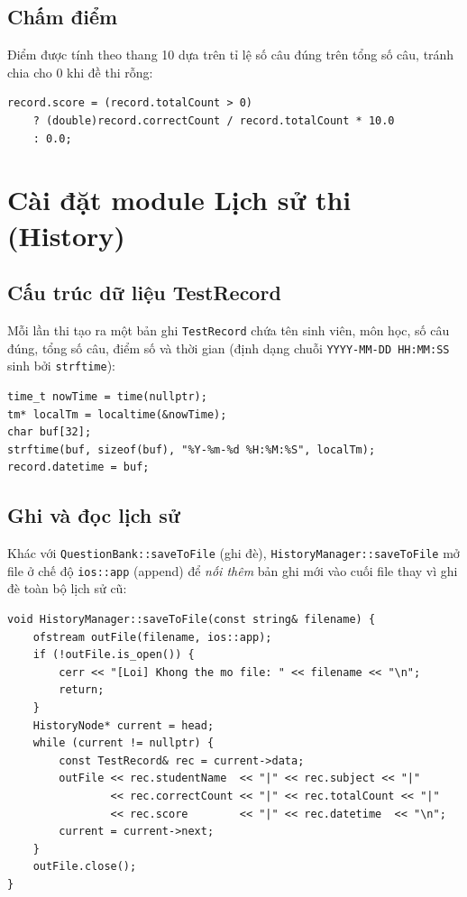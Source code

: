 \documentclass[11pt]{report}
\begin{document}
\subsection{Chấm điểm}

Điểm được tính theo thang 10 dựa trên tỉ lệ số câu đúng trên tổng số câu, tránh chia cho 0 khi đề thi rỗng:

\begin{lstlisting}[caption={Công thức tính điểm (Exam.cpp)}, label={lst:exam_score}]
record.score = (record.totalCount > 0)
    ? (double)record.correctCount / record.totalCount * 10.0
    : 0.0;
\end{lstlisting}

\section{Cài đặt module Lịch sử thi (History)}

\subsection{Cấu trúc dữ liệu TestRecord}

Mỗi lần thi tạo ra một bản ghi \texttt{TestRecord} chứa tên sinh viên, môn học, số câu đúng, tổng số câu, điểm số và thời gian (định dạng chuỗi \texttt{YYYY-MM-DD HH:MM:SS} sinh bởi \texttt{strftime}):

\begin{lstlisting}[caption={Ghi nhận timestamp khi nộp bài (Exam.cpp)}, label={lst:timestamp}]
time_t nowTime = time(nullptr);
tm* localTm = localtime(&nowTime);
char buf[32];
strftime(buf, sizeof(buf), "%Y-%m-%d %H:%M:%S", localTm);
record.datetime = buf;
\end{lstlisting}

\subsection{Ghi và đọc lịch sử}

Khác với \texttt{QuestionBank::saveToFile} (ghi đè), \texttt{HistoryManager::saveToFile} mở file ở chế độ \texttt{ios::app} (append) để \textit{nối thêm} bản ghi mới vào cuối file thay vì ghi đè toàn bộ lịch sử cũ:

\begin{lstlisting}[caption={Ghi lịch sử ở chế độ append (History.cpp)}, label={lst:history_save}]
void HistoryManager::saveToFile(const string& filename) {
    ofstream outFile(filename, ios::app);
    if (!outFile.is_open()) {
        cerr << "[Loi] Khong the mo file: " << filename << "\n";
        return;
    }
    HistoryNode* current = head;
    while (current != nullptr) {
        const TestRecord& rec = current->data;
        outFile << rec.studentName  << "|" << rec.subject << "|"
                << rec.correctCount << "|" << rec.totalCount << "|"
                << rec.score        << "|" << rec.datetime  << "\n";
        current = current->next;
    }
    outFile.close();
}
\end{lstlisting}
\end{document}
